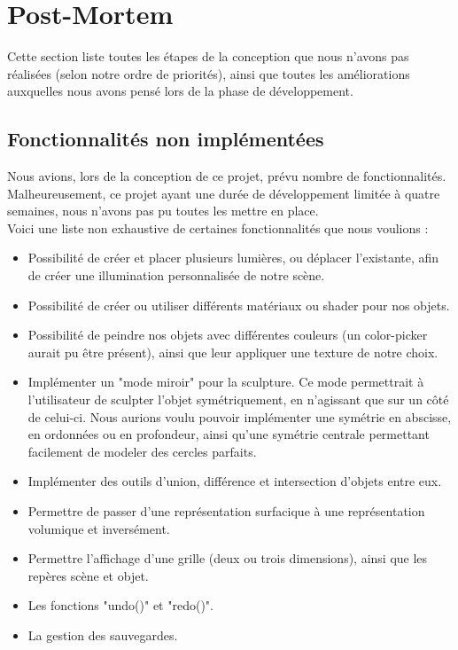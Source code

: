 \documentclass[a4paper]{memoir}
\begin{document}
	\chapter{Post-Mortem}
		Cette section liste toutes les étapes de la conception que nous n'avons pas réalisées (selon notre ordre de priorités), ainsi que toutes les 
		améliorations auxquelles nous avons pensé lors de la phase de développement.
		
		\section{Fonctionnalités non implémentées}
			Nous avions, lors de la conception de ce projet, prévu nombre de fonctionnalités. Malheureusement, ce projet ayant une durée de 
			développement limitée à quatre semaines, nous n'avons pas pu toutes les mettre en place.\\
			Voici une liste non exhaustive de certaines fonctionnalités que nous voulions :
			\begin{itemize}
				\item Possibilité de créer et placer plusieurs lumières, ou déplacer l'existante, afin de créer une illumination personnalisée de notre 
				scène.
				\item Possibilité de créer ou utiliser différents matériaux ou shader pour nos objets.
				\item Possibilité de peindre nos objets avec différentes couleurs (un color-picker aurait pu être présent), ainsi que leur appliquer 
				une texture de notre choix.
				\item Implémenter un "mode miroir" pour la sculpture. Ce mode permettrait à l'utilisateur de sculpter l'objet symétriquement, en 
				n'agissant que sur un côté de celui-ci. Nous aurions voulu pouvoir implémenter une symétrie en abscisse, en ordonnées ou en profondeur, 
				ainsi qu'une symétrie centrale permettant facilement de modeler des cercles parfaits.
				\item Implémenter des outils d'union, différence et intersection d'objets entre eux.
				\item Permettre de passer d'une représentation surfacique à une représentation volumique et inversément.
				\item Permettre l'affichage d'une grille (deux ou trois dimensions), ainsi que les repères scène et objet.
				\item Les fonctions "undo()" et "redo()".
				\item La gestion des sauvegardes.
			\end{itemize}
			
\end{document}
